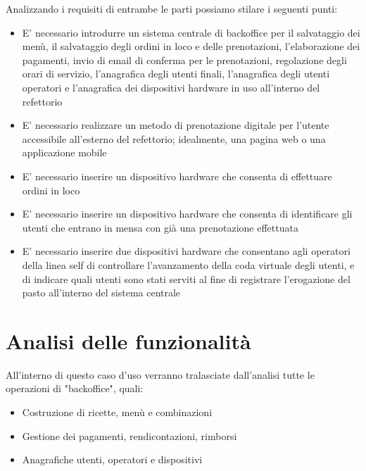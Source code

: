 \documentclass[a4paper, titlepage, 12pt, openright, twoside]{book}
\begin{document}
Analizzando i requisiti di entrambe le parti possiamo stilare i seguenti punti:
\begin{itemize}
	\item E' necessario introdurre un sistema centrale di backoffice per il salvataggio dei menù, il salvataggio degli ordini in loco e delle prenotazioni,
		  l'elaborazione dei pagamenti, invio di email di conferma per le prenotazioni, regolazione degli orari di servizio, l'anagrafica degli utenti finali, l'anagrafica degli 	 
		  utenti operatori e l'anagrafica dei dispositivi hardware in uso all'interno del refettorio
	\item E' necessario realizzare un metodo di prenotazione digitale per l'utente accessibile all'esterno del refettorio; idealmente, una pagina web o una applicazione mobile
	\item E' necessario inserire un dispositivo hardware che consenta di effettuare ordini in loco
	\item E' necessario inserire un dispositivo hardware che consenta di identificare gli utenti che entrano in mensa con già una prenotazione effettuata
	\item E' necessario inserire due dispositivi hardware che consentano agli operatori della linea self di controllare l'avanzamento della coda virtuale degli utenti,
		  e di indicare quali utenti sono stati serviti al fine di registrare l'erogazione del pasto all'interno del sistema centrale
\end{itemize}

\section{Analisi delle funzionalità}

All'interno di questo caso d'uso verranno tralasciate dall'analisi tutte le operazioni di "backoffice", quali:
\begin{itemize}
	\item Costruzione di ricette, menù e combinazioni
	\item Gestione dei pagamenti, rendicontazioni, rimborsi
	\item Anagrafiche utenti, operatori e dispositivi
\end{itemize}
\end{document}

